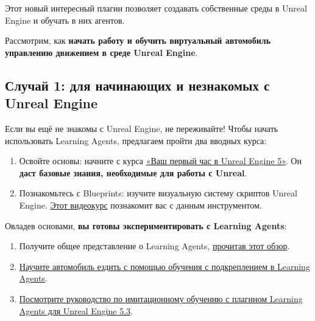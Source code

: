 \documentclass[11pt,a4paper]{article}
\begin{document}
Этот новый интересный плагин позволяет создавать собственные среды в Unreal Engine и обучать в них агентов.

Рассмотрим, как \textbf{начать работу и обучить виртуальный автомобиль управлению движением в среде Unreal Engine}.


\subsection{Случай 1: для начинающих и незнакомых с Unreal Engine}\label{case-1-i-dont-know-anything-about-unreal-engine-and-beginners-in-unreal-engine}

Если вы ещё не знакомы с Unreal Engine, не переживайте! Чтобы начать использовать Learning Agents, предлагаем пройти два вводных курса:

\begin{enumerate}
\def\labelenumi{\arabic{enumi}.}
\item
  Освойте основы: начните с курса \href{https://dev.epicgames.com/community/learning/courses/ZpX/your-first-hour-in-unreal-engine-5/E7L/introduction-to-your-first-hour-in-unreal-engine-5}{«Ваш первый час в Unreal Engine 5»}. Он \textbf{даст базовые знания, необходимые для работы с Unreal}.
\item
  Познакомьтесь с Blueprints: изучите визуальную систему скриптов Unreal Engine. \href{https://youtu.be/W0brCeJNMqk?si=zy4t4t1l6FMIzbpz}{Этот видеокурс} познакомит вас с данным инструментом.
\end{enumerate}

Овладев основами, \textbf{вы готовы экспериментировать с Learning Agents}:

\begin{enumerate}
\def\labelenumi{\arabic{enumi}.}
\setcounter{enumi}{2}
\item
  Получите общее представление о Learning Agents, \href{https://dev.epicgames.com/community/learning/tutorials/8OWY/unreal-engine-learning-agents-introduction}{прочитав этот обзор}.
\item
  \href{https://dev.epicgames.com/community/learning/tutorials/qj2O/unreal-engine-learning-to-drive}{Научите автомобиль ездить с помощью обучения с подкреплением в Learning Agents}.
\item
  \href{https://www.youtube.com/watch?v=NwYUNlFvajQ}{Посмотрите руководство по имитационному обучению с плагином Learning Agents для Unreal Engine 5.3}.
\end{enumerate}
\end{document}
